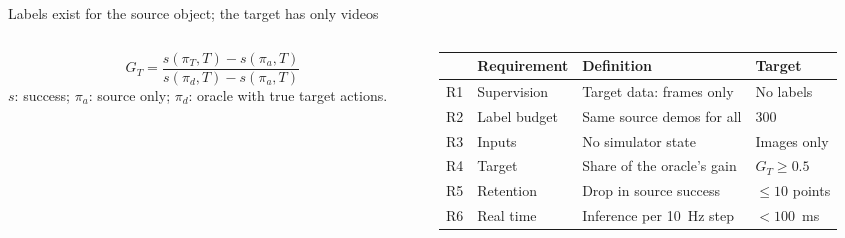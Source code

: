 \documentclass[aspectratio=169,11pt]{beamer}
\begin{document}
\begin{frame}{Labels exist for the source object; the target has only videos}
  \begin{columns}[c]
    \begin{column}{0.4\textwidth}
      \centering
      \[
        G_T = \frac{s(\pi_T, T) - s(\pi_a, T)}{s(\pi_d, T) - s(\pi_a, T)}
      \]
      {\scriptsize $s$: success; $\pi_a$: source only; $\pi_d$: oracle with true target
      actions.}
    \end{column}
    \begin{column}{0.58\textwidth}
      \scriptsize
      \begin{tabular}{@{}llp{3.3cm}l@{}}
        \toprule
        & Requirement & Definition & Target \\
        \midrule
        R1 & Supervision & Target data: frames only & No labels \\
        R2 & Label budget & Same source demos for all & 300 \\
        R3 & Inputs & No simulator state & Images only \\
        R4 & Target & Share of the oracle's gain & $G_T \geq 0.5$ \\
        R5 & Retention & Drop in source success & $\leq 10$ points \\
        R6 & Real time & Inference per 10~Hz step & $< 100$~ms \\
        \bottomrule
      \end{tabular}
    \end{column}
  \end{columns}
\end{frame}
\end{document}
